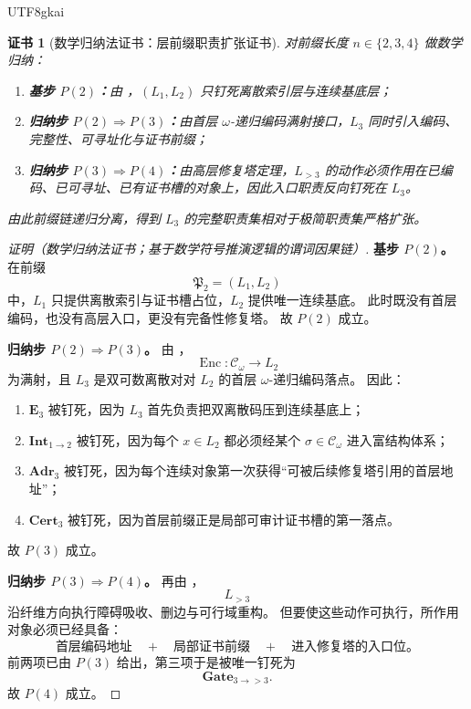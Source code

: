 \documentclass[12pt]{article}
\newtheorem{Certificate}{证书}[section]
\begin{document}
\begin{CJK*}{UTF8}{gkai}
\begin{Certificate}[数学归纳法证书：层前缀职责扩张证书]
\label{cert:tex1-ch12-axiom-downgraded}
对前缀长度 \(n\in\{2,3,4\}\) 做数学归纳：
\begin{enumerate}
  \item \textbf{基步 \(P(2)\)：}由 \cite{RepoTex41HomotopyRepairBundle}，\((L_1,L_2)\) 只钉死离散索引层与连续基底层；
  \item \textbf{归纳步 \(P(2)\Rightarrow P(3)\)：}由首层 \(\omega\)-递归编码满射接口，\(L_3\) 同时引入编码、完整性、可寻址化与证书前缀；
  \item \textbf{归纳步 \(P(3)\Rightarrow P(4)\)：}由高层修复塔定理，\(L_{>3}\) 的动作必须作用在已编码、已可寻址、已有证书槽的对象上，因此入口职责反向钉死在 \(L_3\)。
\end{enumerate}
由此前缀链递归分离，得到 \(L_3\) 的完整职责集相对于极简职责集严格扩张。
\end{Certificate}

\begin{proof}[证明（数学归纳法证书；基于数学符号推演逻辑的谓词因果链）]
\textbf{基步 \(P(2)\)。}
在前缀
\[
  \mathfrak P_2=(L_1,L_2)
\]
中，\(L_1\) 只提供离散索引与证书槽占位，\(L_2\) 提供唯一连续基底。
此时既没有首层编码，也没有高层入口，更没有完备性修复塔。
故 \(P(2)\) 成立。

\textbf{归纳步 \(P(2)\Rightarrow P(3)\)。}
由 \cite{RepoTex41HomotopyRepairBundle}，
\[
  \operatorname{Enc}:\mathcal C_\omega\to L_2
\]
为满射，且 \(L_3\) 是双可数离散对对 \(L_2\) 的首层 \(\omega\)-递归编码落点。
因此：
\begin{enumerate}
  \item \(\mathbf E_3\) 被钉死，因为 \(L_3\) 首先负责把双离散码压到连续基底上；
  \item \(\mathbf{Int}_{1\to2}\) 被钉死，因为每个 \(x\in L_2\) 都必须经某个 \(\sigma\in\mathcal C_\omega\) 进入富结构体系；
  \item \(\mathbf{Adr}_3\) 被钉死，因为每个连续对象第一次获得“可被后续修复塔引用的首层地址”；
  \item \(\mathbf{Cert}_3\) 被钉死，因为首层前缀正是局部可审计证书槽的第一落点。
\end{enumerate}
故 \(P(3)\) 成立。

\textbf{归纳步 \(P(3)\Rightarrow P(4)\)。}
再由 \cite{RepoTex41HomotopyRepairBundle}，
\[
  L_{>3}
\]
沿纤维方向执行障碍吸收、删边与可行域重构。
但要使这些动作可执行，所作用对象必须已经具备：
\[
  \text{首层编码地址}
  \quad+\quad
  \text{局部证书前缀}
  \quad+\quad
  \text{进入修复塔的入口位。}
\]
前两项已由 \(P(3)\) 给出，第三项于是被唯一钉死为
\[
  \mathbf{Gate}_{3\to >3}.
\]
故 \(P(4)\) 成立。


\end{proof}
\end{CJK*}
\end{document}
